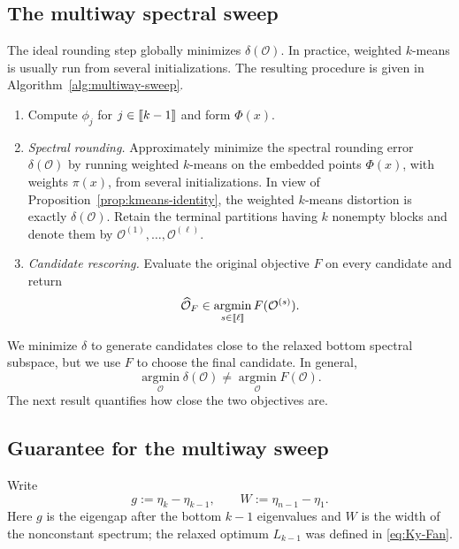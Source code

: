 \documentclass[11pt]{article}
\newcommand{\1}{\mathbf{1}}
\providecommand{\llbracket}{\mathopen{[\mkern-2.7mu[}}
\providecommand{\rrbracket}{\mathclose{]\mkern-2.7mu]}}
\begin{document}
\subsection{The multiway spectral sweep}

The ideal rounding step globally minimizes $\delta(\mathcal O)$.  In
practice, weighted $k$-means is usually run from several
initializations.  The resulting procedure is given in
Algorithm~\ref{alg:multiway-sweep}.

\begin{algorithm}[H]
\caption{Multiway spectral sweep for $F$}
\label{alg:multiway-sweep}
\begin{enumerate}
    \item Compute $\phi_j$ for
    $j\in\llbracket k-1\rrbracket$ and form $\Phi(x)$.
    \item \emph{Spectral rounding.} Approximately minimize the spectral rounding error
    $\delta(\mathcal O)$ by running weighted $k$-means on the embedded
    points $\Phi(x)$, with weights $\pi(x)$, from several
    initializations.  In view of Proposition~\ref{prop:kmeans-identity},
    the weighted $k$-means distortion is exactly $\delta(\mathcal O)$.
    Retain the terminal partitions having $k$ nonempty blocks and denote
    them by
    $\mathcal O^{(1)},\ldots,\mathcal O^{(\ell)}$.
    \item \emph{Candidate rescoring.} Evaluate the original objective $F$ on every candidate and
    return
    \[
        \widehat{\mathcal O}_F\in
        \operatorname*{argmin}_{s\in\llbracket\ell\rrbracket}
        F(\mathcal O^{(s)}).
    \]
\end{enumerate}
\end{algorithm}

We minimize $\delta$ to generate candidates close to the relaxed
bottom spectral subspace, but we use $F$ to choose the final candidate.  In
general,
\[
    \operatorname*{argmin}_{\mathcal O}\delta(\mathcal O)
    \neq
    \operatorname*{argmin}_{\mathcal O}F(\mathcal O).
\]
The next result quantifies how close the two objectives are.

\subsection{Guarantee for the multiway sweep}

Write
\begin{equation}
    g:=\eta_{k}-\eta_{k-1},
    \qquad
    W:=\eta_{n-1}-\eta_1.
    \label{eq:g-W}
\end{equation}
Here $g$ is the eigengap after the bottom $k-1$ eigenvalues and $W$ is
the width of the nonconstant spectrum; the relaxed optimum
$L_{k-1}$ was defined in \eqref{eq:Ky-Fan}.
\end{document}
